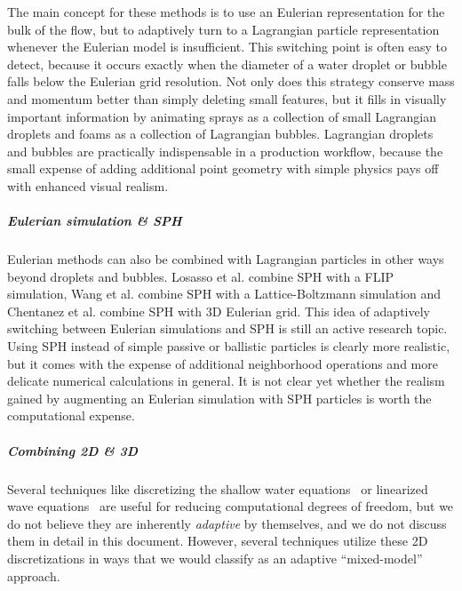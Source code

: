 The main concept for these methods is to use an Eulerian representation for the bulk of the flow, but to adaptively turn to a Lagrangian particle representation whenever the Eulerian model is insufficient. This switching point is often easy to detect, because it occurs exactly when the diameter of a water droplet or bubble falls below the Eulerian grid resolution. Not only does this strategy conserve mass and momentum better than simply deleting small features, but it fills in visually important information by animating sprays as a collection of small Lagrangian droplets and foams as a collection of Lagrangian bubbles. Lagrangian droplets and bubbles are practically indispensable in a production workflow, because the small expense of adding additional point geometry with simple physics pays off with enhanced visual realism.

\subparagraph*{Eulerian simulation \& SPH}
Eulerian methods can also be combined with Lagrangian particles in other ways beyond droplets and bubbles.
Losasso et al. \cite{Losasso2008} combine SPH with a FLIP simulation, Wang et al. \cite{Wang2013} combine SPH with a Lattice-Boltzmann simulation and Chentanez et al. \cite{Chentanez2014} combine SPH with 3D Eulerian grid.
This idea of adaptively switching between Eulerian simulations and SPH is still an active research topic. Using SPH instead of simple passive or ballistic particles is clearly more realistic, but it comes with the expense of additional neighborhood operations and more delicate numerical calculations in general. It is not clear yet whether the realism gained by augmenting an Eulerian simulation with SPH particles is worth the computational expense.

\subparagraph*{Combining 2D \& 3D}
Several techniques like discretizing the shallow water equations~\cite{layton2002numerically,hagen2005visual} or linearized wave equations~\cite{kass1990rapid,tessendorf2004interactive,keeler2014ocean} are useful for reducing computational degrees of freedom, but we do not believe they are inherently {\em adaptive} by themselves, and we do not discuss them in detail in this document. However, several techniques utilize these 2D discretizations in ways that we would classify as an adaptive ``mixed-model'' approach.

